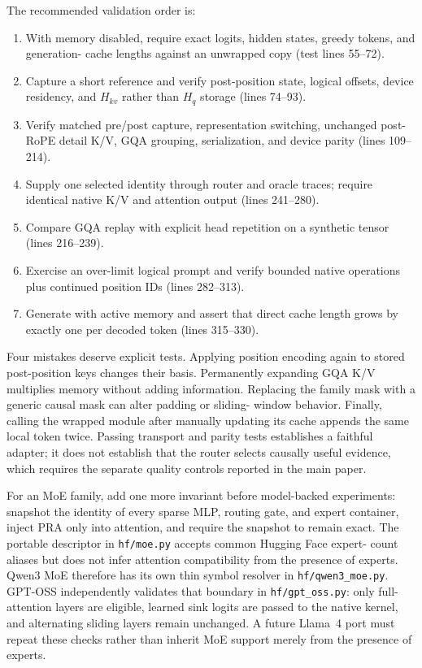 \documentclass[11pt]{article}
\begin{document}
The recommended validation order is:
\begin{enumerate}[leftmargin=*]
\item With memory disabled, require exact logits, hidden states, greedy tokens, and generation-
cache lengths against an unwrapped copy (test lines 55--72).
\item Capture a short reference and verify post-position state, logical offsets, device
residency, and $H_{kv}$ rather than $H_q$ storage (lines 74--93).
\item Verify matched pre/post capture, representation switching, unchanged post-RoPE detail K/V,
GQA grouping, serialization, and device parity (lines 109--214).
\item Supply one selected identity through router and oracle traces; require identical native
K/V and attention output (lines 241--280).
\item Compare GQA replay with explicit head repetition on a synthetic tensor (lines 216--239).
\item Exercise an over-limit logical prompt and verify bounded native operations plus continued
position IDs (lines 282--313).
\item Generate with active memory and assert that direct cache length grows by exactly one per
decoded token (lines 315--330).
\end{enumerate}

Four mistakes deserve explicit tests. Applying position encoding again to stored post-position
keys changes their basis. Permanently expanding GQA K/V multiplies memory without adding
information. Replacing the family mask with a generic causal mask can alter padding or sliding-
window behavior. Finally, calling the wrapped module after manually updating its cache appends
the same local token twice. Passing transport and parity tests establishes a faithful adapter;
it does not establish that the router selects causally useful evidence, which requires the
separate quality controls reported in the main paper.

For an MoE family, add one more invariant before model-backed experiments:
snapshot the identity of every sparse MLP, routing gate, and expert container,
inject PRA only into attention, and require the snapshot to remain exact. The
portable descriptor in \texttt{hf/moe.py} accepts common Hugging Face expert-
count aliases but does not infer attention compatibility from the presence of
experts. Qwen3 MoE therefore has its own thin symbol resolver in
\texttt{hf/qwen3\_moe.py}. GPT-OSS independently validates that boundary in
\texttt{hf/gpt\_oss.py}: only full-attention layers are eligible, learned sink
logits are passed to the native kernel, and alternating sliding layers remain
unchanged. A future Llama~4 port must repeat these checks rather than inherit
MoE support merely from the presence of experts.
\end{document}
